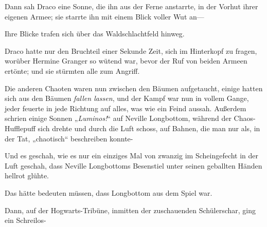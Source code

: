 Dann sah Draco eine Sonne, die ihn aus der Ferne anstarrte, in der Vorhut ihrer eigenen Armee; sie starrte ihn mit einem Blick voller Wut an—

Ihre Blicke trafen sich über das Waldschlachtfeld hinweg.

Draco hatte nur den Bruchteil einer Sekunde Zeit, sich im Hinterkopf zu fragen, worüber Hermine Granger so wütend war, bevor der Ruf von beiden Armeen ertönte; und sie stürmten alle zum Angriff.

\later

Die anderen Chaoten waren nun zwischen den Bäumen aufgetaucht, einige hatten sich aus den Bäumen \emph{fallen lassen}, und der Kampf war nun in vollem Gange, jeder feuerte in jede Richtung auf alles, was wie ein Feind aussah. Außerdem schrien einige Sonnen „\emph{Luminos!}“ auf Neville Longbottom, während der Chaos-Hufflepuff sich drehte und durch die Luft schoss, auf Bahnen, die man nur als, in der Tat, „chaotisch“ beschreiben konnte-

Und es geschah, wie es nur ein einziges Mal von zwanzig im Scheingefecht in der Luft geschah, dass Neville Longbottoms Besenstiel unter seinen geballten Händen hellrot glühte.

Das hätte bedeuten müssen, dass Longbottom aus dem Spiel war.

Dann, auf der Hogwarts-Tribüne, inmitten der zuschauenden Schülerschar, ging ein Schreilos-


